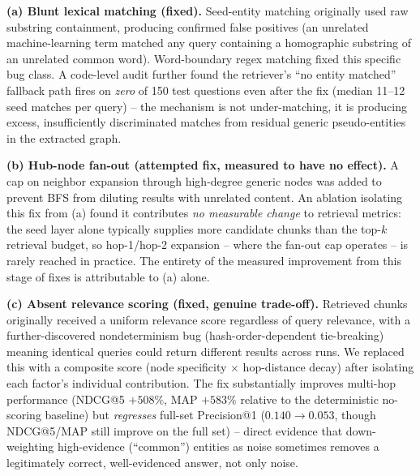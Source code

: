 \documentclass[sigconf,anonymous,review]{acmart}
\begin{document}
\textbf{(a) Blunt lexical matching (fixed).} Seed-entity matching originally used raw substring containment, producing confirmed false positives (an unrelated machine-learning term matched any query containing a homographic substring of an unrelated common word). Word-boundary regex matching fixed this specific bug class. A code-level audit further found the retriever's ``no entity matched'' fallback path fires on \emph{zero} of 150 test questions even after the fix (median 11--12 seed matches per query) -- the mechanism is not under-matching, it is producing excess, insufficiently discriminated matches from residual generic pseudo-entities in the extracted graph.

\textbf{(b) Hub-node fan-out (attempted fix, measured to have no effect).} A cap on neighbor expansion through high-degree generic nodes was added to prevent BFS from diluting results with unrelated content. An ablation isolating this fix from (a) found it contributes \emph{no measurable change} to retrieval metrics: the seed layer alone typically supplies more candidate chunks than the top-$k$ retrieval budget, so hop-1/hop-2 expansion -- where the fan-out cap operates -- is rarely reached in practice. The entirety of the measured improvement from this stage of fixes is attributable to (a) alone.

\textbf{(c) Absent relevance scoring (fixed, genuine trade-off).} Retrieved chunks originally received a uniform relevance score regardless of query relevance, with a further-discovered nondeterminism bug (hash-order-dependent tie-breaking) meaning identical queries could return different results across runs. We replaced this with a composite score (node specificity $\times$ hop-distance decay) after isolating each factor's individual contribution. The fix substantially improves multi-hop performance (NDCG@5 $+508\%$, MAP $+583\%$ relative to the deterministic no-scoring baseline) but \emph{regresses} full-set Precision@1 ($0.140 \rightarrow 0.053$, though NDCG@5/MAP still improve on the full set) -- direct evidence that down-weighting high-evidence (``common'') entities as noise sometimes removes a legitimately correct, well-evidenced answer, not only noise.
\end{document}
